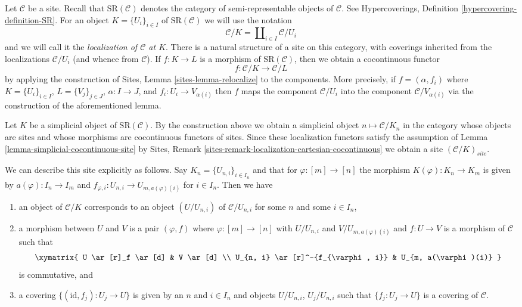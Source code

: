 \noindent
Let $\mathcal{C}$ be a site. Recall that $\text{SR}(\mathcal{C})$
denotes the category of semi-representable objects of $\mathcal{C}$.
See Hypercoverings, Definition \ref{hypercovering-definition-SR}.
For an object $K = \{U_i\}_{i \in I}$ of $\text{SR}(\mathcal{C})$
we will use the notation
$$
\mathcal{C}/K = \coprod\nolimits_{i \in I} \mathcal{C}/U_i
$$
and we will call it the {\it localization of $\mathcal{C}$ at $K$}.
There is a natural structure of a site on this category, with
coverings inherited from the localizations $\mathcal{C}/U_i$
(and whence from $\mathcal{C}$). If $f : K \to L$ is a morphism of
$\text{SR}(\mathcal{C})$, then we obtain a cocontinuous functor
$$
f : \mathcal{C}/K \longrightarrow \mathcal{C}/L
$$
by applying the construction of Sites, Lemma \ref{sites-lemma-relocalize}
to the components. More precisely, if $f = (\alpha, f_i)$
where $K = \{U_i\}_{i \in I}$, $L = \{V_j\}_{j \in J}$, $\alpha : I \to J$,
and $f_i : U_i \to V_{\alpha(i)}$ then $f$ maps the component
$\mathcal{C}/U_i$ into the component $\mathcal{C}/V_{\alpha(i)}$
via the construction of the aforementioned lemma.
 
\medskip\noindent
Let $K$ be a simplicial object of $\text{SR}(\mathcal{C})$.
By the construction above we obtain a simplicial object
$n \mapsto \mathcal{C}/K_n$ in the category
whose objects are sites and whose morphisms are cocontinuous
functors of sites. Since these localization functors satisfy the assumption
of Lemma \ref{lemma-simplicial-cocontinuous-site} by
Sites, Remark \ref{sites-remark-localization-cartesian-cocontinuous}
we obtain a site $(\mathcal{C}/K)_{site}$.

\medskip\noindent
We can describe this site explicitly as follows. Say
$K_n = \{U_{n, i}\}_{i \in I_n}$ and that for $\varphi : [m] \to [n]$
the morphism $K(\varphi) : K_n \to K_m$ is given by
$a(\varphi) : I_n \to I_m$ and
$f_{\varphi, i} : U_{n, i} \to U_{m, a(\varphi)(i)}$ for $i \in I_n$.
Then we have
\begin{enumerate}
\item an object of $\mathcal{C}/K$ corresponds to an object $(U/U_{n, i})$
of $\mathcal{C}/U_{n, i}$ for some $n$ and some $i \in I_n$,
\item a morphism between $U$ and $V$ is a pair $(\varphi, f)$
where $\varphi : [m] \to [n]$ with $U/U_{n, i}$ and
$V/U_{m, a(\varphi)(i)}$ and $f : U \to V$ is a morphism of $\mathcal{C}$
such that
$$
\xymatrix{
U \ar[r]_f \ar[d] & V \ar[d] \\
U_{n, i} \ar[r]^-{f_{\varphi, i}} & U_{m, a(\varphi)(i)}
}
$$
is commutative, and
\item a covering $\{(\text{id}, f_j) : U_j \to U\}$ is given by
an $n$ and $i \in I_n$ and objects $U/U_{n, i}$, $U_j/U_{n, i}$
such that $\{f_j  : U_j \to U\}$ is a covering of $\mathcal{C}$.
\end{enumerate}

